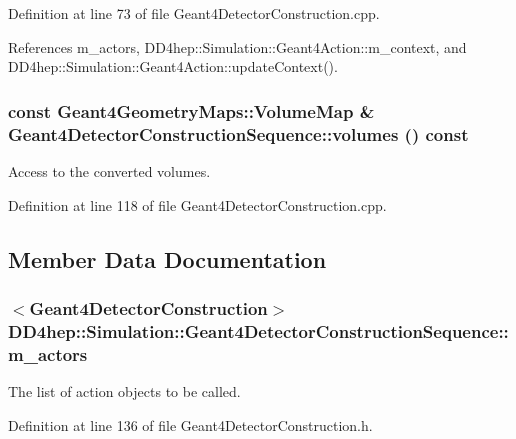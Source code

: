 Definition at line 73 of file Geant4DetectorConstruction.cpp.

References m\_\-actors, DD4hep::Simulation::Geant4Action::m\_\-context, and DD4hep::Simulation::Geant4Action::updateContext().\hypertarget{class_d_d4hep_1_1_simulation_1_1_geant4_detector_construction_sequence_a1e85bfd70c6a133dca29b6b77fb8e12d}{
\subsubsection[{volumes}]{\setlength{\rightskip}{0pt plus 5cm}const {\bf Geant4GeometryMaps::VolumeMap} \& Geant4DetectorConstructionSequence::volumes () const}}
\label{class_d_d4hep_1_1_simulation_1_1_geant4_detector_construction_sequence_a1e85bfd70c6a133dca29b6b77fb8e12d}


Access to the converted volumes. 

Definition at line 118 of file Geant4DetectorConstruction.cpp.

\subsection{Member Data Documentation}
\hypertarget{class_d_d4hep_1_1_simulation_1_1_geant4_detector_construction_sequence_aa67150ae24c47c85655faf5bd89fad28}{
\subsubsection[{m\_\-actors}]{$<${\bf Geant4DetectorConstruction}$>$ {\bf DD4hep::Simulation::Geant4DetectorConstructionSequence::m\_\-actors}}}
\label{class_d_d4hep_1_1_simulation_1_1_geant4_detector_construction_sequence_aa67150ae24c47c85655faf5bd89fad28}


The list of action objects to be called. 

Definition at line 136 of file Geant4DetectorConstruction.h.

